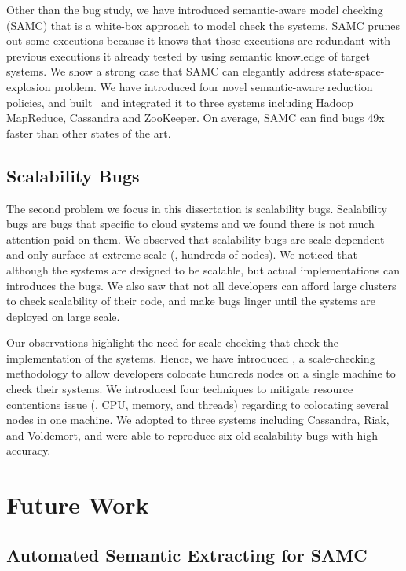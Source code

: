 Other than the bug study, we have introduced semantic-aware model checking
(SAMC) that is a white-box approach to model check the systems. SAMC prunes out
some executions because it knows that those executions are redundant with
previous executions it already tested by using semantic knowledge of target
systems. We show a strong case that SAMC can elegantly address
state-space-explosion problem. We have introduced four novel semantic-aware
reduction policies, and built \sampro\ and integrated it to three systems
including Hadoop MapReduce, Cassandra and ZooKeeper. On average, SAMC can find
bugs 49x faster than other states of the art.

\subsection{Scalability Bugs}

The second problem we focus in this dissertation is scalability bugs.
Scalability bugs are bugs that specific to cloud systems and we found there is
not much attention paid on them. We observed that scalability bugs are scale
dependent and only surface at extreme scale (\eg, hundreds of nodes). We noticed
that although the systems are designed to be scalable, but actual
implementations can introduces the bugs. We also saw that not all developers can
afford large clusters to check scalability of their code, and make bugs linger
until the systems are deployed on large scale.

Our observations highlight the need for scale checking that check the
implementation of the systems. Hence, we have introduced \sck, a scale-checking
methodology to allow developers colocate hundreds nodes on a single machine to
check their systems. We introduced four techniques to mitigate resource
contentions issue (\ie, CPU, memory, and threads) regarding to colocating
several nodes in one machine. We adopted \sck to three systems including
Cassandra, Riak, and Voldemort, and were able to reproduce six old scalability
bugs with high accuracy.

\section{Future Work}

\subsection{Automated Semantic Extracting for SAMC}
\label{sec-autosamc}

